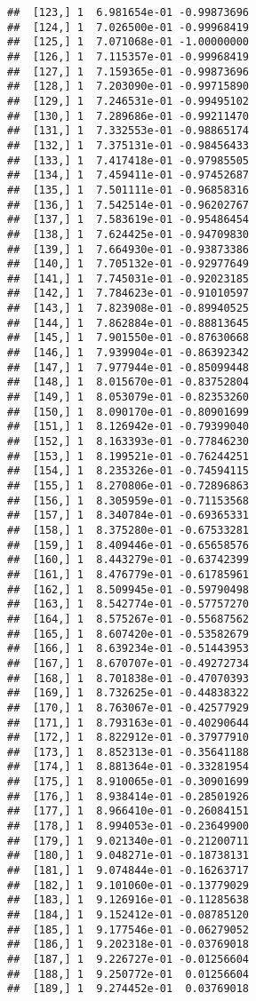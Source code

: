 \documentclass[
  12pt,
]{article}
\begin{document}
\begin{verbatim}
##  [123,] 1  6.981654e-01 -0.99873696
##  [124,] 1  7.026500e-01 -0.99968419
##  [125,] 1  7.071068e-01 -1.00000000
##  [126,] 1  7.115357e-01 -0.99968419
##  [127,] 1  7.159365e-01 -0.99873696
##  [128,] 1  7.203090e-01 -0.99715890
##  [129,] 1  7.246531e-01 -0.99495102
##  [130,] 1  7.289686e-01 -0.99211470
##  [131,] 1  7.332553e-01 -0.98865174
##  [132,] 1  7.375131e-01 -0.98456433
##  [133,] 1  7.417418e-01 -0.97985505
##  [134,] 1  7.459411e-01 -0.97452687
##  [135,] 1  7.501111e-01 -0.96858316
##  [136,] 1  7.542514e-01 -0.96202767
##  [137,] 1  7.583619e-01 -0.95486454
##  [138,] 1  7.624425e-01 -0.94709830
##  [139,] 1  7.664930e-01 -0.93873386
##  [140,] 1  7.705132e-01 -0.92977649
##  [141,] 1  7.745031e-01 -0.92023185
##  [142,] 1  7.784623e-01 -0.91010597
##  [143,] 1  7.823908e-01 -0.89940525
##  [144,] 1  7.862884e-01 -0.88813645
##  [145,] 1  7.901550e-01 -0.87630668
##  [146,] 1  7.939904e-01 -0.86392342
##  [147,] 1  7.977944e-01 -0.85099448
##  [148,] 1  8.015670e-01 -0.83752804
##  [149,] 1  8.053079e-01 -0.82353260
##  [150,] 1  8.090170e-01 -0.80901699
##  [151,] 1  8.126942e-01 -0.79399040
##  [152,] 1  8.163393e-01 -0.77846230
##  [153,] 1  8.199521e-01 -0.76244251
##  [154,] 1  8.235326e-01 -0.74594115
##  [155,] 1  8.270806e-01 -0.72896863
##  [156,] 1  8.305959e-01 -0.71153568
##  [157,] 1  8.340784e-01 -0.69365331
##  [158,] 1  8.375280e-01 -0.67533281
##  [159,] 1  8.409446e-01 -0.65658576
##  [160,] 1  8.443279e-01 -0.63742399
##  [161,] 1  8.476779e-01 -0.61785961
##  [162,] 1  8.509945e-01 -0.59790498
##  [163,] 1  8.542774e-01 -0.57757270
##  [164,] 1  8.575267e-01 -0.55687562
##  [165,] 1  8.607420e-01 -0.53582679
##  [166,] 1  8.639234e-01 -0.51443953
##  [167,] 1  8.670707e-01 -0.49272734
##  [168,] 1  8.701838e-01 -0.47070393
##  [169,] 1  8.732625e-01 -0.44838322
##  [170,] 1  8.763067e-01 -0.42577929
##  [171,] 1  8.793163e-01 -0.40290644
##  [172,] 1  8.822912e-01 -0.37977910
##  [173,] 1  8.852313e-01 -0.35641188
##  [174,] 1  8.881364e-01 -0.33281954
##  [175,] 1  8.910065e-01 -0.30901699
##  [176,] 1  8.938414e-01 -0.28501926
##  [177,] 1  8.966410e-01 -0.26084151
##  [178,] 1  8.994053e-01 -0.23649900
##  [179,] 1  9.021340e-01 -0.21200711
##  [180,] 1  9.048271e-01 -0.18738131
##  [181,] 1  9.074844e-01 -0.16263717
##  [182,] 1  9.101060e-01 -0.13779029
##  [183,] 1  9.126916e-01 -0.11285638
##  [184,] 1  9.152412e-01 -0.08785120
##  [185,] 1  9.177546e-01 -0.06279052
##  [186,] 1  9.202318e-01 -0.03769018
##  [187,] 1  9.226727e-01 -0.01256604
##  [188,] 1  9.250772e-01  0.01256604
##  [189,] 1  9.274452e-01  0.03769018

\end{verbatim}
\end{document}
